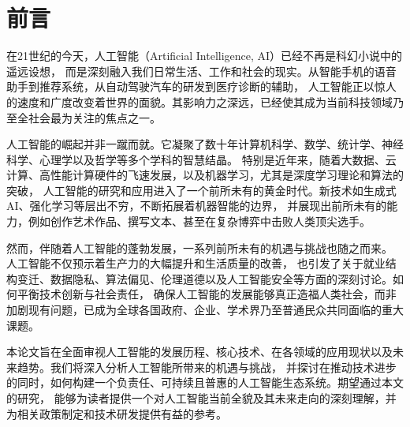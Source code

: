 \section*{前言}

在21世纪的今天，人工智能（Artificial Intelligence, AI）\cite{zhai2021review}已经不再是科幻小说中的遥远设想，
而是深刻融入我们日常生活、工作和社会的现实。从智能手机的语音助手到推荐系统，从自动驾驶汽车的研发到医疗诊断的辅助，
人工智能正以惊人的速度和广度改变着世界的面貌。其影响力之深远，已经使其成为当前科技领域乃至全社会最为关注的焦点之一。

人工智能的崛起并非一蹴而就。它凝聚了数十年计算机科学、数学、统计学、神经科学、心理学以及哲学等多个学科的智慧结晶。
特别是近年来，随着大数据、云计算、高性能计算硬件的飞速发展，以及机器学习，尤其是深度学习理论和算法的突破，
人工智能的研究和应用进入了一个前所未有的黄金时代。新技术如生成式AI、强化学习等层出不穷，不断拓展着机器智能的边界，
并展现出前所未有的能力，例如创作艺术作品、撰写文本、甚至在复杂博弈中击败人类顶尖选手。

然而，伴随着人工智能的蓬勃发展，一系列前所未有的机遇与挑战也随之而来。
人工智能不仅预示着生产力的大幅提升和生活质量的改善，
也引发了关于就业结构变迁、数据隐私、算法偏见、伦理道德以及人工智能安全等方面的深刻讨论。如何平衡技术创新与社会责任，
确保人工智能的发展能够真正造福人类社会，而非加剧现有问题，已成为全球各国政府、企业、学术界乃至普通民众共同面临的重大课题。

本论文旨在全面审视人工智能的发展历程、核心技术、在各领域的应用现状以及未来趋势。我们将深入分析人工智能所带来的机遇与挑战，
并探讨在推动技术进步的同时，如何构建一个负责任、可持续且普惠的人工智能生态系统。期望通过本文的研究，
能够为读者提供一个对人工智能当前全貌及其未来走向的深刻理解，并为相关政策制定和技术研发提供有益的参考。